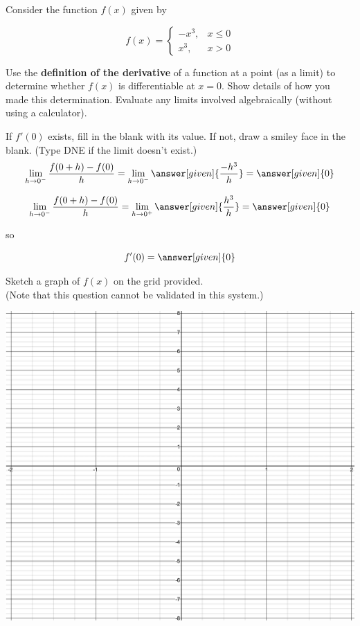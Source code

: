 \documentclass[handout]{ximera}
\begin{document}
\begin{problem}
Consider the function $f(x)$ given by

$$f(x) = \begin{cases} \displaystyle -x^3, & x \leq 0 \\ x^3, & x >0 \end{cases}$$

\begin{question}
Use the \textbf{definition of the derivative} of a function at a point (as a limit) to determine whether $f(x)$ is differentiable at $x=0$. Show details of how you made this determination. Evaluate any limits involved algebraically (without using a calculator).

If $f'(0)$ exists, fill in the blank with its value. If not, draw a smiley face in the blank. (Type DNE if the limit doesn't exist.) \\
\[
\displaystyle \lim_{h\to 0^-} \dfrac{f(0+h) - f(0)}{h} = \displaystyle \lim_{h\to 0^-} \answer[given]{\dfrac{-h^3}{h}} = \answer[given]{0}
\]

\[
\displaystyle \lim_{h\to 0^-} \dfrac{f(0+h) - f(0)}{h} = \displaystyle \lim_{h\to 0^+} \answer[given]{\dfrac{h^3}{h}} = \answer[given]{0}
\]

so

\[
f'(0) = \answer[given]{0}
\]
\end{question}

\begin{question}
Sketch a graph of $f(x)$ on the grid provided. \\(Note that this question cannot be validated in this system.)

\includegraphics[scale=0.05]{2X8.png}
\end{question}


\end{problem}
\end{document}
